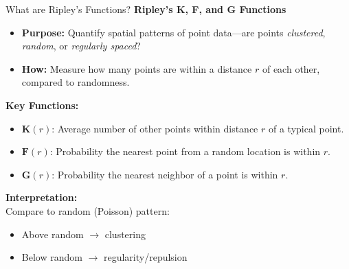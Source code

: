 \documentclass[aspectratio=169]{beamer}
\begin{document}
\begin{frame}{What are Ripley's Functions?}
    \textbf{Ripley's K, F, and G Functions}\\
    \vspace{1em}
    \begin{itemize}
        \item \textbf{Purpose:} Quantify spatial patterns of point data---are points \textit{clustered}, \textit{random}, or \textit{regularly spaced}?
        \item \textbf{How:} Measure how many points are within a distance $r$ of each other, compared to randomness.
    \end{itemize}
    \vspace{1em}
    \textbf{Key Functions:}
    \begin{itemize}
        \item $\mathbf{K}(r)$: Average number of other points within distance $r$ of a typical point.
        \item $\mathbf{F}(r)$: Probability the nearest point from a random location is within $r$.
        \item $\mathbf{G}(r)$: Probability the nearest neighbor of a point is within $r$.
    \end{itemize}
    \vspace{1em}
    \textbf{Interpretation:}\\
    Compare to random (Poisson) pattern:
    \begin{itemize}
        \item Above random $\rightarrow$ clustering
        \item Below random $\rightarrow$ regularity/repulsion
    \end{itemize}
\end{frame}
\end{document}
